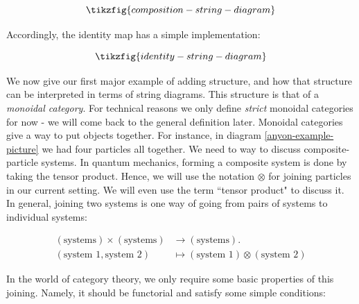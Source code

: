 \begin{equation*}
\tikzfig{composition-string-diagram}
\end{equation*}

Accordingly, the identity map has a simple implementation:

\begin{equation*}
\tikzfig{identity-string-diagram}
\end{equation*}

We now give our first major example of adding structure, and how that structure can be interpreted in terms of string diagrams. This structure is that of a {\em monoidal category}. For technical reasons we only define {\em strict} monoidal categories for now - we will come back to the general definition later. Monoidal categories give a way to put objects together. For instance, in diagram \ref{anyon-example-picture} we had four particles all together. We need to way to discuss composite-particle systems. In quantum mechanics, forming a composite system is done by taking the tensor product. Hence, we will use the notation $\otimes$ for joining particles in our current setting. We will even use the term ``tensor product" to discuss it. In general, joining two systems is one way of going from pairs of systems to individual systems:

\begin{align*}
(\text{systems})\times (\text{systems})&\xrightarrow{}(\text{systems}).\\
(\text{system 1}, \text{system 2})&\mapsto (\text{system 1})\otimes (\text{system 2})
\end{align*}

In the world of category theory, we only require some basic properties of this joining. Namely, it should be functorial and satisfy some simple conditions: 

